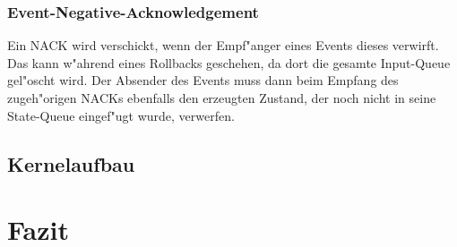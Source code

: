 \documentclass{scrreprt}
\begin{document}
\subsection{Event-Negative-Acknowledgement}
Ein NACK wird verschickt, wenn der Empf"anger eines Events dieses verwirft. Das kann w"ahrend eines Rollbacks geschehen,
da dort die gesamte Input-Queue gel"oscht wird. Der Absender des Events muss dann beim Empfang des zugeh"origen NACKs
ebenfalls den erzeugten Zustand, der noch nicht in seine State-Queue eingef"ugt wurde, verwerfen.


\section{Kernelaufbau}

\chapter{Fazit}
\end{document}
